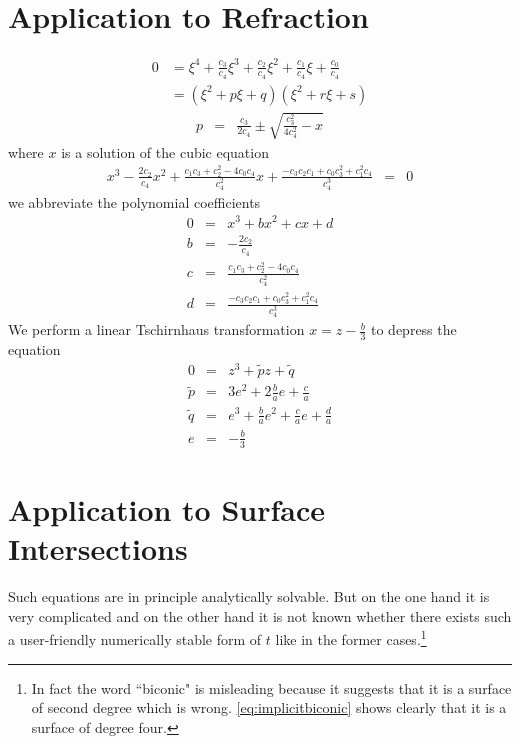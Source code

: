 \documentclass[12pt,a4paper,twoside,openright,BCOR10mm,headsepline,titlepage,abstracton,chapterprefix,final]{scrreprt}
\begin{document}
\section{Application to Refraction}

\begin{align}
0 &=  \xi ^4 
      + \frac{c_3}{c_4} \xi ^3 
      + \frac{c_2}{c_4} \xi ^2 
      + \frac{c_1}{c_4} \xi 
      + \frac{c_0}{c_4}
\\
 &= ( \xi^2 + p \xi + q )( \xi^2 + r \xi + s) 
\end{align}
\begin{eqnarray}
  p &=& \frac{c_3}{2 c_4} \pm \sqrt{ \frac{c_3^2}{4 c_4^2} - x}
\end{eqnarray}
where $x$ is a solution of the cubic equation
\begin{eqnarray}
  x^3 
  - \frac{2 c_2}{c_4} x^2 
  + \frac{c_1 c_3 + c_2^2 - 4 c_0 c_4}{c_4^2} x
  + \frac{- c_3 c_2 c_1 + c_0 c_3^2 + c_1^2 c_4}{c_4^3}
  &=& 0
\end{eqnarray}
we abbreviate the polynomial coefficients
\begin{eqnarray}
 0 &=& x^3 + b x^2 + c x + d\\
 b &=& - \frac{2 c_2}{c_4}\\
 c &=&   \frac{c_1 c_3 + c_2^2 - 4 c_0 c_4}{c_4^2}\\
 d &=&   \frac{- c_3 c_2 c_1 + c_0 c_3^2 + c_1^2 c_4}{c_4^3}
\end{eqnarray}
We perform a linear Tschirnhaus transformation
$x = z -\frac{b}{3}$ to depress the equation
\begin{eqnarray}
0 &=& z^3 + \tilde{p} z + \tilde{q}
\\
\tilde{p} &=& 3 e^2 + 2 \frac{b}{a} e + \frac{c}{a}
\\
\tilde{q} &=& e^3 + \frac{b}{a} e^2 + \frac{c}{a} e + \frac{d}{a}
\\
e &=& - \frac{b}{3}
\end{eqnarray}



\section{Application to Surface Intersections}
Such equations are in principle analytically solvable. But on the one hand it is very complicated and on the other hand 
it is not known whether there exists such a user-friendly numerically stable form of $t$ like in the former cases.\footnote{
In fact the word ``biconic" is misleading because it suggests that
it is a surface of second degree which is wrong. \eqref{eq:implicitbiconic}
shows clearly that it is a surface of degree four.}
\end{document}

